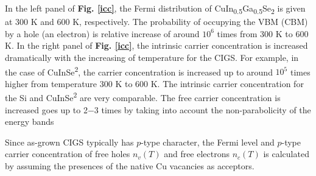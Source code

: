 \documentclass[a4paper, 12pt, titlepage,oneside,drop]{kthesis}
\begin{document}
\begin{table}[H]
\centering
 \captionsetup{width=1\textwidth}
\caption {Band-gap energies $E_g$ and Fermi energy $E_F$ at 300 K and 600 K, respectively.}\label{chen3}
\end{table}



In the left panel of \textbf{Fig. \ref{icc}}, the Fermi distribution of CuIn\textsubscript{0.5}Ga\textsubscript{0.5}Se\textsubscript{2} is given at 300 K and 600 K, respectively. The probability of occupying the VBM (CBM) by a hole (an electron) is 
relative increase of around $10^6$ times from 300 K to 600 K. In the right panel of \textbf{Fig. \ref{icc}}, the intrinsic carrier concentration is increased dramatically with the increasing of temperature for the CIGS. For example, in the case of CuInSe\textsuperscript{2}, 
the carrier concentration is increased up to around $10^{5}$ times higher from temperature 300 K to 600 K. The intrinsic carrier concentration for the Si and CuInSe\textsuperscript{2} are very comparable. The free carrier 
concentration is increased goes up to 2$-$3 times by taking into account the non-parabolicity of the energy bands

Since as-grown CIGS typically has $p$-type character, the Fermi level and $p$-type carrier concentration of free holes $n_v(T)$ and free electrons $n_c(T)$ is calculated by 
assuming the presences of the native Cu vacancies as acceptors. 
\end{document}
